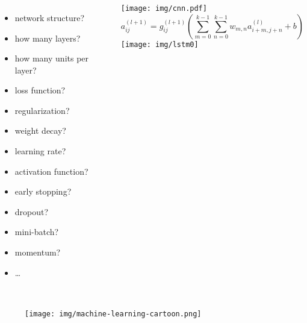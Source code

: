 \documentclass[UTF8,11pt,colorlinks,compress,openany]{beamer}%
\begin{document}
\begin{frame}\frametitle{}
	\begin{columns}
			\begin{itemize}
				\item network structure?
				\item how many layers?
				\item how many units per layer?
				\item loss function?
				\item regularization?
				\item weight decay?
				\item learning rate?
				\item activation function?
				\item early stopping?
				\item dropout?
				\item mini-batch?
				\item momentum?
				\item \dots
			\end{itemize}
			\centering\texttt{[image: img/cnn.pdf]}
			\[a_{ij}^{(l+1)}=g_{ij}^{(l+1)}\left(\sum_{m=0}^{k-1} \sum_{n=0}^{k-1} w_{m,n} a_{i+m,j+n}^{(l)}+b\right)\]
			\centering\texttt{[image: img/lstm0]}
	\end{columns}
\end{frame}

\begin{frame}\frametitle{}
\begin{figure}[H]
\texttt{[image: img/machine-learning-cartoon.png]}
\end{figure}
\end{frame}
\end{document}
